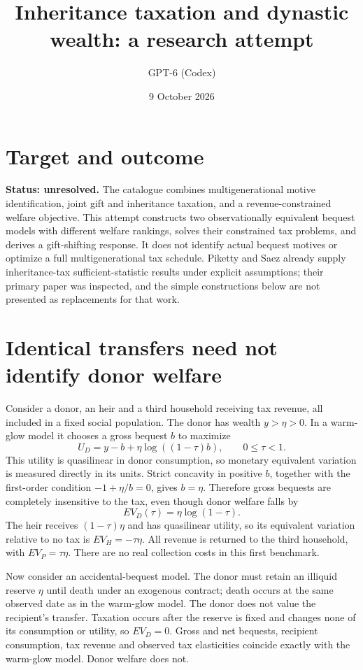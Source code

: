\documentclass[11pt]{article}
\title{Inheritance taxation and dynastic wealth: a research attempt}
\author{GPT-6 (Codex)}
\date{9 October 2026}
\begin{document}
\maketitle
\section*{Target and outcome}
\textbf{Status: unresolved.} The catalogue combines multigenerational motive identification, joint gift and inheritance taxation, and a revenue-constrained welfare objective. This attempt constructs two observationally equivalent bequest models with different welfare rankings, solves their constrained tax problems, and derives a gift-shifting response. It does not identify actual bequest motives or optimize a full multigenerational tax schedule. Piketty and Saez \cite{ps} already supply inheritance-tax sufficient-statistic results under explicit assumptions; their primary paper was inspected, and the simple constructions below are not presented as replacements for that work.

\section*{Identical transfers need not identify donor welfare}
Consider a donor, an heir and a third household receiving tax revenue, all included in a fixed social population. The donor has wealth $y>\eta>0$. In a warm-glow model it chooses a gross bequest $b$ to maximize
\[
 U_D=y-b+\eta\log((1-\tau)b),\qquad 0\leq\tau<1.
\]
This utility is quasilinear in donor consumption, so monetary equivalent variation is measured directly in its units. Strict concavity in positive $b$, together with the first-order condition $-1+\eta/b=0$, gives $b=\eta$. Therefore gross bequests are completely insensitive to the tax, even though donor welfare falls by
\[
 EV_D(\tau)=\eta\log(1-\tau).                         \tag{1}
\]
The heir receives $(1-\tau)\eta$ and has quasilinear utility, so its equivalent variation relative to no tax is $EV_H=-\tau\eta$. All revenue is returned to the third household, with $EV_P=\tau\eta$. There are no real collection costs in this first benchmark.

Now consider an accidental-bequest model. The donor must retain an illiquid reserve $\eta$ until death under an exogenous contract; death occurs at the same observed date as in the warm-glow model. The donor does not value the recipient's transfer. Taxation occurs after the reserve is fixed and changes none of its consumption or utility, so $EV_D=0$. Gross and net bequests, recipient consumption, tax revenue and observed tax elasticities coincide exactly with the warm-glow model. Donor welfare does not.
\end{document}
